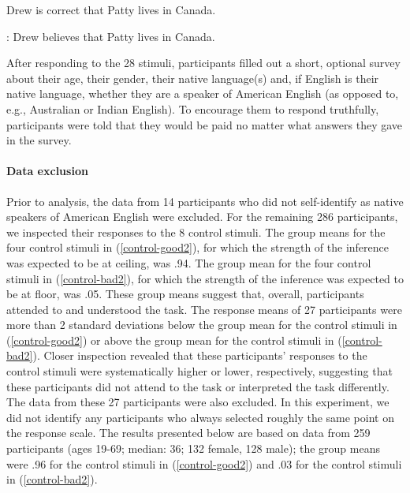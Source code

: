 \documentclass[11pt,fleqn]{article}
\newcommand{\6}{\mbox{$[\hspace*{-.6mm}[$}}
\newcommand{\9}{\mbox{$]\hspace*{-.6mm}]$}}
\begin{document}
\begin{exe}
\ex\label{train2}
\begin{xlist}
 Drew is correct that Patty lives in Canada. 

: Drew believes that Patty lives in Canada.
\end{xlist}
\end{exe}

After responding to the 28 stimuli, participants filled out a short, optional survey about their age, their gender, their native language(s) and, if English is their native language, whether they are a speaker of American English (as opposed to, e.g., Australian or Indian English). To encourage them to respond truthfully, participants were told that they would be paid no matter what answers they gave in the survey.

\paragraph{Data exclusion}

Prior to analysis, the data from 14 participants who did not self-identify as native speakers of American English were excluded. For the remaining 286 participants, we inspected their responses to the 8 control stimuli. The group means for the four control stimuli in (\ref{control-good2}), for which the strength of the inference was expected to be at ceiling, was .94. The group mean for the four control stimuli in (\ref{control-bad2}), for which the strength of the inference was expected to be at floor, was .05. These group means suggest that, overall, participants attended to and understood the task. The response means of 27 participants were more than 2 standard deviations below the group mean for the control stimuli in (\ref{control-good2}) or above the group mean for the control stimuli in (\ref{control-bad2}). Closer inspection revealed that these participants' responses to the control stimuli were systematically higher or lower, respectively, suggesting that these participants did not attend to the task or interpreted the task differently. The data from these 27 participants were also excluded. In this experiment, we did not identify any participants who always selected roughly the same point on the response scale. The results presented below are based on data from 259 participants (ages 19-69; median: 36; 132 female, 128 male); the group means were .96 for the control stimuli in (\ref{control-good2}) and .03 for the control stimuli in (\ref{control-bad2}).
\end{document}
